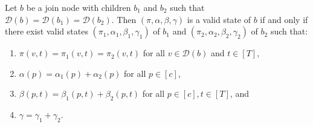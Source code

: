 \documentclass[runningheads]{llncs}
\begin{document}
\begin{lemma} \label{lem:tw join}
    Let $b$ be a join node with children $b_1$ and $b_2$ such that $\mathcal{D}(b)=\mathcal{D}(b_1)=\mathcal{D}(b_2)$. Then $(\pi,\alpha,\beta,\gamma)$ is a valid state of $b$ if and only if there exist valid states $(\pi_1,\alpha_1,\beta_1,\gamma_1)$ of $b_1$ and $(\pi_2,\alpha_2,\beta_2,\gamma_2)$ of $b_2$ such that:
    \begin{enumerate}
        \item $\pi(v,t)=\pi_1(v,t)=\pi_2(v,t)$ for all $v\in \mathcal{D}(b)$ and $t\in [T]$,
        \item $\alpha(p)=\alpha_{1}(p)+\alpha_2(p)$ for all $p \in[c]$,
        \item $\beta(p,t)=\beta_1(p,t)+\beta_2(p,t)$ for all $p \in [c],t\in [T]$, and
        \item $\gamma=\gamma_1+\gamma_2$.
    \end{enumerate}
\end{lemma}
\end{document}
